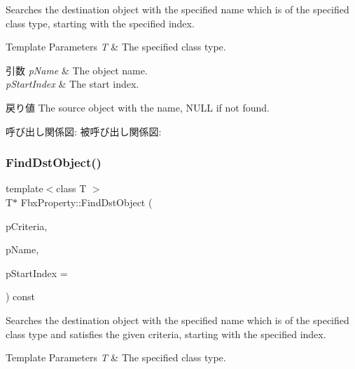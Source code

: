 Searches the destination object with the specified name which is of the specified class type, starting with the specified index. 
\begin{DoxyTemplParams}{Template Parameters}
{\em T} & The specified class type. \\
\hline
\end{DoxyTemplParams}

\begin{DoxyParams}{引数}
{\em p\+Name} & The object name. \\
\hline
{\em p\+Start\+Index} & The start index. \\
\hline
\end{DoxyParams}
\begin{DoxyReturn}{戻り値}
The source object with the name, N\+U\+LL if not found. 
\end{DoxyReturn}
呼び出し関係図\+:
被呼び出し関係図\+:
\mbox{\label{class_fbx_property_a76ea2989d26c3e48488b4edb88d79ddb}} 
\subsubsection{\texorpdfstring{Find\+Dst\+Object()}{FindDstObject()}\hspace{0.1cm}{\footnotesize\ttfamily [4/4]}}
{\footnotesize\ttfamily template$<$class T $>$ \\
T$\ast$ Fbx\+Property\+::\+Find\+Dst\+Object (\begin{DoxyParamCaption}\item[{const \hyperlink{class_fbx_criteria}{Fbx\+Criteria} \&}]{p\+Criteria,  }\item[{const char $\ast$}]{p\+Name,  }\item[{const int}]{p\+Start\+Index = {} }\end{DoxyParamCaption}) const}

Searches the destination object with the specified name which is of the specified class type and satisfies the given criteria, starting with the specified index. 
\begin{DoxyTemplParams}{Template Parameters}
{\em T} & The specified class type. \\
\hline
\end{DoxyTemplParams}

